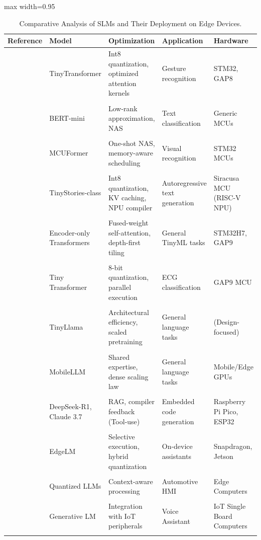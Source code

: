 \documentclass{ieeeaccess}
\begin{document}
\begin{table}[htbp]
\scriptsize
\centering
\caption{Comparative Analysis of SLMs and Their Deployment on Edge Devices.\label{tab:related_work}}
\begin{adjustbox}{max width=0.95\paperheight}
\begin{tabular}{@{}p{2cm}p{2cm}p{3cm}p{2.5cm}p{2.9cm}@{}}
\toprule
\textbf{Reference} & \textbf{Model} & \textbf{Optimization} & \textbf{Application} & \textbf{Hardware} \\
\midrule
\cite{yang2023tinyformer} & TinyTransformer & Int8 quantization, optimized attention kernels & Gesture recognition & STM32, GAP8 \\\\
\cite{10.1145/3676536.3676747} & BERT-mini & Low-rank approximation, NAS & Text classification & Generic MCUs \\\\
\cite{liang2023mcuformer} & MCUFormer  & One-shot NAS, memory-aware scheduling & Visual recognition & STM32 MCUs \\\\
\cite{scherer2024deeploy} & TinyStories-class & Int8 quantization, KV caching, NPU compiler & Autoregressive text generation & Siracusa MCU (RISC-V NPU) \\\\
\cite{JungOptimizing2025} & Encoder-only Transformers & Fused-weight self-attention, depth-first tiling & General TinyML tasks & STM32H7, GAP9 \\\\
\cite{BusiaTinyTransformer2025} & Tiny Transformer & 8-bit quantization, parallel execution & ECG classification & GAP9 MCU \\\\
\cite{zhang2024tinyllama} & TinyLlama & Architectural efficiency, scaled pretraining & General language tasks & (Design-focused) \\\\
\cite{mobilellm2024} & MobileLLM & Shared expertise, dense scaling law & General language tasks & Mobile/Edge GPUs \\\\
\cite{CaoEmbedAgent} & DeepSeek-R1, Claude 3.7 & RAG, compiler feedback (Tool-use) & Embedded code generation & Raspberry Pi Pico, ESP32 \\\\
\cite{edgeLM2024} & EdgeLM & Selective execution, hybrid quantization & On-device assistants & Snapdragon, Jetson \\\\
\cite{varshni2025embedded} & Quantized LLMs & Context-aware processing & Automotive HMI & Edge Computers \\\\
\cite{yauri2024generative} & Generative LM & Integration with IoT peripherals & Voice Assistant & IoT Single Board Computers \\\\


\end{tabular}
\end{adjustbox}
\end{table}
\end{document}

